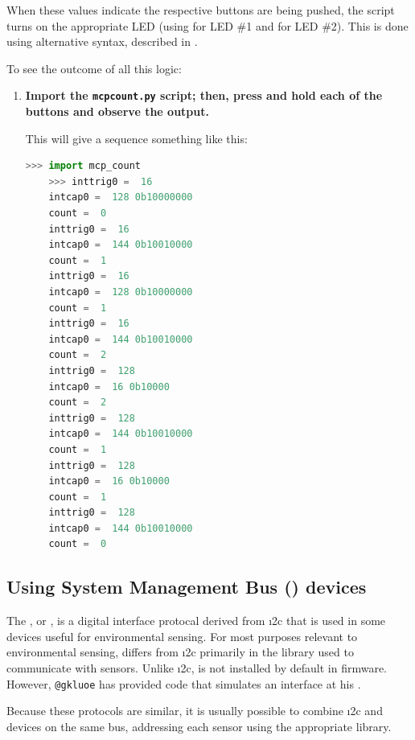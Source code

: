 When these values indicate the respective buttons are being pushed, the script turns on the appropriate LED (using  for LED \#1 and  for LED \#2).
This is done using alternative syntax, described in .

To see the outcome of all this logic:
\begin{enumerate}[resume]
	\item \textbf{Import the \texttt{mcp\textunderscore count.py} script; then, press and hold each of the buttons and observe the output.}

	This will give a sequence something like this:
  \begin{lstlisting}[language=Python]
	>>> import mcp_count
	>>> inttrig0 =  16
	intcap0 =  128 0b10000000
	count =  0
	inttrig0 =  16
	intcap0 =  144 0b10010000
	count =  1
	inttrig0 =  16
	intcap0 =  128 0b10000000
	count =  1
	inttrig0 =  16
	intcap0 =  144 0b10010000
	count =  2
	inttrig0 =  128
	intcap0 =  16 0b10000
	count =  2
	inttrig0 =  128
	intcap0 =  144 0b10010000
	count =  1
	inttrig0 =  128
	intcap0 =  16 0b10000
	count =  1
	inttrig0 =  128
	intcap0 =  144 0b10010000
	count =  0
\end{lstlisting}

\end{enumerate}










\subsection{Using System Management Bus (\smbus) devices}
The , or \smbus, is a digital interface protocal derived from \i2c that is used in some devices useful for environmental sensing.
For most purposes relevant to environmental sensing, \smbus differs from \i2c primarily in the \Micropython library used to communicate with sensors.
Unlike \i2c, \smbus is not installed by default in \Micropython firmware.
However, \verb|@gkluoe| has provided code that simulates an \smbus interface at his .

Because these protocols are similar, it is usually possible to combine \i2c and \smbus devices on the same bus, addressing each sensor using the appropriate library.

